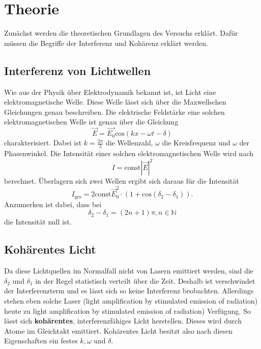 \section{Theorie}
\label{sec:Theorie}

Zunächst werden die theoretischen Grundlagen des Versuchs erklärt.
Dafür müssen die Begriffe der Interferenz und Kohärenz erklärt werden.

\subsection{Interferenz von Lichtwellen}
Wie aus der Physik über Elektrodynamik bekannt ist, ist Licht eine elektromagnetische Welle.
Diese Welle lässt sich über die Maxwellschen Gleichungen genau beschreiben.
Die elektrische Feldstärke eine solchen elektromagnetischen Welle ist genau über die Gleichung
\begin{equation}
    \vec{E} = \vec{E_0} \text{cos}\left( kx - \omega t - \delta \right)
\end{equation} 
charakterisiert. Dabei ist $k = \frac{2 \pi}{\lambda}$ die Wellenzahl, $\omega$ die Kreisfrequenz und $\omega$ der Phasenwinkel.
Die Intensität einer solchen elektromagnetischen Welle wird nach
\begin{equation}
    I = \text{const} |\vec{E}|^2
\end{equation}
berechnet. Überlagern sich zwei Wellen ergibt sich daraus für die Intensität
\begin{equation}
    I_\text{ges} = 2 \text{const} \vec{E}^2_0 \cdot \left( 1 + \text{cos} \left( \delta_2 - \delta_1 \right) \right).
\end{equation}
Anzumerken ist dabei, dass bei 
\begin{equation*}
    \delta_2 - \delta_1 = (2n + 1) \pi, n \in \mathbb{N}
\end{equation*}
die Intensität null ist.
\subsection{Kohärentes Licht}
Da diese Lichtquellen im Normalfall nicht von Lasern emittiert werden, sind die
$\delta_2$ und $\delta_1$ in der Regel statistisch verteilt über die Zeit.
Deshalb ist verschwindet der Interferenzterm und es lässt sich so keine Interferenz beobachten.
Allerdings stehen eben solche Laser (light amplification by stimulated emission of radiation) heute zu light amplification by stimulated emission of radiation) Verfügung.
So lässt sich \textbf{kohärentes}, interferenzfähiges Licht herstellen.
Dieses wird durch Atome im Gleichtakt emittiert.
Kohärentes Licht besitzt also nach diesen Eigenschaften ein festes $k, \omega$ und $\delta$.

